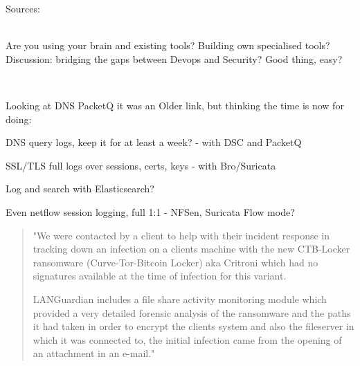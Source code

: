 \documentclass[20pt,landscape,a4paper,footrule]{foils}
\begin{document}
Sources:\\
{\tiny
{}\\
}





Are you using your brain and existing tools? Building own specialised tools?\\
Discussion: bridging the gaps between Devops and Security? Good thing, easy?

{\footnotesize
{}\\
}



Looking at DNS PacketQ it was an Older link, but thinking the time is now for doing:

\begin{list2}
\item DNS query logs, keep it for at least a week? - with DSC and PacketQ
\item SSL/TLS full logs over sessions, certs, keys - with Bro/Suricata\\
\item Log and search with Elasticsearch?\\
\item Even netflow session logging, full 1:1 - NFSen, Suricata Flow mode?
\end{list2}



\begin{quote}
"We were contacted by a client to help with their incident response in tracking down an
infection on a clients machine with the new CTB-Locker ransomware (Curve-Tor-Bitcoin Locker)
aka Critroni which had no signatures available at the time of infection for this variant.

LANGuardian includes a file share activity monitoring module which provided a very
detailed forensic analysis of the ransomware and the paths it had taken in order to
encrypt the clients system and also the fileserver in which it was connected to, the
initial infection came from the opening of an attachment in an e-mail."
\end{quote}
\end{document}

